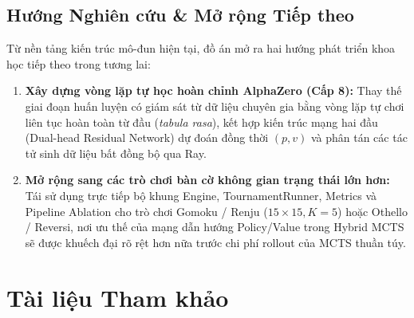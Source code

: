 \documentclass[a4paper,12pt]{report}
\begin{document}
\subsection{Hướng Nghiên cứu \& Mở rộng Tiếp theo}
Từ nền tảng kiến trúc mô-đun hiện tại, đồ án mở ra hai hướng phát triển khoa học tiếp theo trong tương lai:
\begin{enumerate}[leftmargin=1.2cm]
    \item \textbf{Xây dựng vòng lặp tự học hoàn chỉnh AlphaZero (Cấp 8):} Thay thế giai đoạn huấn luyện có giám sát từ dữ liệu chuyên gia bằng vòng lặp tự chơi liên tục hoàn toàn từ đầu (\textit{tabula rasa}), kết hợp kiến trúc mạng hai đầu (Dual-head Residual Network) dự đoán đồng thời $(p, v)$ và phân tán các tác tử sinh dữ liệu bất đồng bộ qua Ray.
    \item \textbf{Mở rộng sang các trò chơi bàn cờ không gian trạng thái lớn hơn:} Tái sử dụng trực tiếp bộ khung Engine, TournamentRunner, Metrics và Pipeline Ablation cho trò chơi Gomoku / Renju ($15 \times 15, K=5$) hoặc Othello / Reversi, nơi ưu thế của mạng dẫn hướng Policy/Value trong Hybrid MCTS sẽ được khuếch đại rõ rệt hơn nữa trước chi phí rollout của MCTS thuần túy.
\end{enumerate}

\clearpage
\section{Tài liệu Tham khảo}
\end{document}
